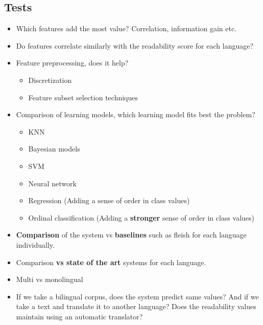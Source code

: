 \documentclass[12pt]{article}
\begin{document}
\subsection{Tests}

\begin{itemize}

\item Which features add the most value? Correlation, information gain etc.

\item Do features correlate similarly with the readability score for each language?

\item Feature preprocessing, does it help?
	\begin{itemize}
	\item Discretization
	\item Feature subset selection techniques
	\end{itemize}
	
\item Comparison of learning models, which learning model fits best the problem?
	\begin{itemize}
	\item KNN
	\item Bayesian models
	\item SVM
	\item Neural network
	\item Regression (Adding a sense of order in class values)
	\item Ordinal classification (Adding a \textbf{stronger} sense of order in class values)
	\end{itemize}

\item \textbf{Comparison} of the system vs \textbf{baselines} such as fleish for each language individually.

\item Comparison \textbf{vs state of the art} systems for each language.

\item Multi vs monolingual
\item If we take a bilingual corpus, does the system predict same values? And if we take a text and translate it to another language? Does the readability values maintain using an automatic translator?
\end{itemize}



{}

\end{document}
